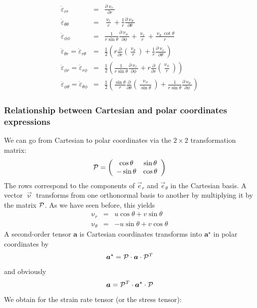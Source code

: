 \begin{eqnarray}
\dot\varepsilon_{rr} 
&=& \frac{\partial \upnu_r}{\partial r} \\
\dot\varepsilon_{\theta\theta} 
&=& \frac{\upnu_r}{r} + \frac{1}{r} \frac{\partial \upnu_\theta}{\partial \theta}  \\
\dot\varepsilon_{\phi\phi} 
&=& \frac{1}{r \sin\theta} \frac{\partial \upnu_\phi}{\partial \phi} +
\frac{\upnu_r}{r} +\frac{\upnu_\theta \cot \theta}{r} \\
\dot\varepsilon_{\theta r} = \dot\varepsilon_{r\theta}   
&=& \frac{1}{2} \left( r \frac{\partial}{\partial r} (\frac{\upnu_\theta}{r} ) 
+\frac{1}{r} \frac{\partial \upnu_r}{\partial \theta} \right) \\
\dot\varepsilon_{\phi r} = \dot\varepsilon_{r\phi}      
&=&  \frac{1}{2} \left(  \frac{1}{r \sin\theta} \frac{\partial \upnu_r}{\partial \phi} 
+ r \frac{\partial }{\partial r} (\frac{\upnu_\phi}{r}) \right)  \\
\dot\varepsilon_{\phi \theta} = \dot\varepsilon_{\theta\phi} 
&=& \frac{1}{2} \left( \frac{\sin \theta}{r} \frac{\partial }{\partial \theta} (\frac{\upnu_\phi}{\sin\theta}) + \frac{1}{r \sin\theta} \frac{\partial \upnu_\theta}{\partial \phi}    \right) 
\end{eqnarray}


\subsubsection{Relationship between Cartesian and polar coordinates expressions}

We can go from Cartesian to polar coordinates  via the $2\times 2$ transformation matrix:
\begin{equation}
{\cal P}=
\left(
\begin{array}{ccc}
\cos\theta & \sin\theta \\
-\sin\theta & \cos\theta
\end{array}
\right)
\end{equation}
The rows correspond to the components of $\vec{e}_r$ and $\vec{e}_\theta$ in the Cartesian basis.
A vector $\vec{\upnu}$ transforms from one orthonormal basis to another by multiplying it by 
the matrix ${\cal P}$. As we have seen before, this yields
\begin{eqnarray}
\upnu_r &=& u \cos\theta + v \sin\theta \\
\upnu_\theta &=& -u \sin\theta + v \cos\theta
\end{eqnarray}
A second-order tensor ${\bm a}$ is Cartesian coordinates transforms into ${\bm a}^\star$
in polar coordinates by 
\[
{\bm a}^\star = {\cal P} \cdot {\bm a} \cdot {\cal P}^T
\]
and obviously 
\[
{\bm a} = {\cal P}^T \cdot {\bm a}^\star \cdot {\cal P}
\]
We obtain for the strain rate tensor (or the stress tensor):

